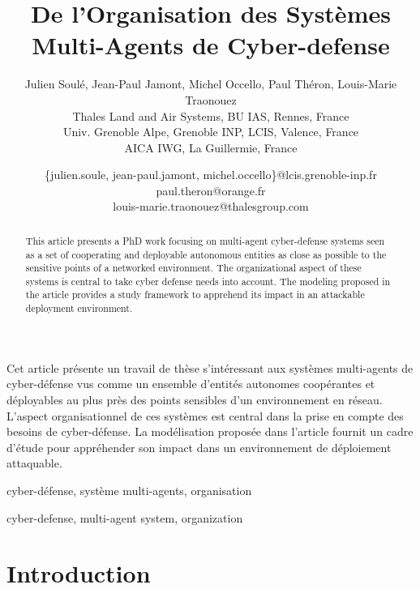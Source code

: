 \documentclass[french]{pfia}
\title{\textbf{De l'Organisation des Systèmes Multi-Agents de Cyber-defense}}
\author{Julien Soulé\fup{1,2}, Jean-Paul Jamont\fup{2}, Michel Occello\fup{2}, Paul Théron\fup{3}, Louis-Marie Traonouez\fup{2}\\[6pt]
\fup{1} Thales Land and Air Systems, BU IAS, Rennes, France\\
\fup{2} Univ. Grenoble Alpe, Grenoble INP, LCIS, Valence, France\\
\fup{3} AICA IWG, La Guillermie, France}
\date{\{julien.soule, jean-paul.jamont, michel.occello\}@lcis.grenoble-inp.fr \\
paul.theron@orange.fr \\
louis-marie.traonouez@thalesgroup.com}
\begin{document}
\maketitle


\begin{resume}
Cet article présente un travail de thèse s'intéressant aux systèmes multi-agents de cyber-défense vus comme un ensemble d'entités autonomes coopérantes et déployables au plus près des points sensibles d'un environnement en réseau. L'aspect organisationnel de ces systèmes est central dans la prise en compte des besoins de cyber-défense. La modélisation proposée dans l'article fournit un cadre d'étude pour appréhender son impact dans un environnement de déploiement attaquable.

\end{resume}


\begin{motscles}
cyber-défense, système multi-agents, organisation
\end{motscles}

\begin{abstract}
This article presents a PhD work focusing on multi-agent cyber-defense systems seen as a set of cooperating and deployable autonomous entities as close as possible to the sensitive points of a networked environment. The organizational aspect of these systems is central to take cyber defense needs into account. The modeling proposed in the article provides a study framework to apprehend its impact in an attackable deployment environment.
\end{abstract}

\begin{keywords}
cyber-defense, multi-agent system, organization
\end{keywords}

\section{Introduction}
\end{document}
